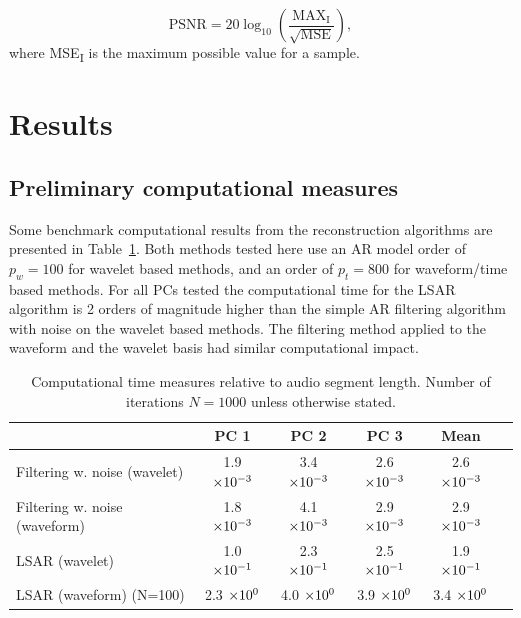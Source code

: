 \begin{equation}\label{eq:PSNRdef}
\textrm{PSNR} = 20 \log_{10} \left( \frac{\textrm{MAX}_\textrm{I}}{\sqrt{\textrm{MSE}}} \right),
\end{equation}
where MSE\textsubscript{I} is the maximum possible value for a sample.


\section{Results}
\subsection{Preliminary computational measures}\label{sec:CompData}
Some benchmark computational results from the reconstruction algorithms are presented in Table~\ref{tab:CompData}. Both methods tested here use an AR model order of $p_w=100$ for wavelet based methods, and an order of $p_t=800$ for waveform/time based methods. For all PCs tested the computational time for the LSAR algorithm is 2 orders of magnitude higher than the simple AR filtering algorithm with noise on the wavelet based methods. The filtering method applied to the waveform and the wavelet basis had similar computational impact.

\begin{table}\begin{center}
\caption{Computational time measures relative to audio segment length. Number of iterations $N=1000$ unless otherwise stated.}
\label{tab:CompData}
\begin{tabular}{|l|c|c|c|c|c|}\hline
                                & PC 1              & PC 2              & PC 3              &  Mean \\ \hline
  Filtering w. noise (wavelet)  & 1.9 $\times 10^{-3}$    & 3.4 $\times 10^{-3}$    & 2.6 $\times 10^{-3}$    &  2.6 $\times 10^{-3}$  \\
  Filtering w. noise (waveform) & 1.8 $\times 10^{-3}$    & 4.1 $\times 10^{-3}$    & 2.9 $\times 10^{-3}$    &  2.9 $\times 10^{-3}$  \\
  LSAR (wavelet)                & 1.0 $\times 10^{-1}$    & 2.3 $\times 10^{-1}$    & 2.5 $\times 10^{-1}$    &  1.9 $\times 10^{-1}$  \\
  LSAR (waveform) (N=100)       & 2.3 $\times 10^{0}$     & 4.0 $\times 10^{0}$     & 3.9 $\times 10^{0}$     &  3.4 $\times 10^{0}$  \\ \hline
\end{tabular}\end{center}\end{table}


